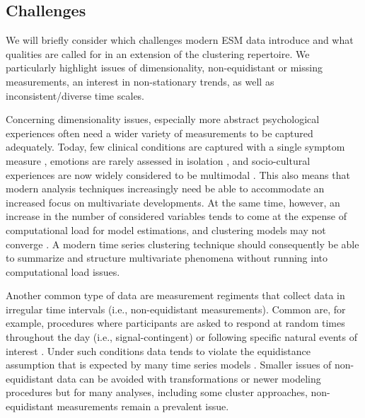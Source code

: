 \documentclass[man, 12pt, a4paper, floatsintext]{apa7}
\theoremstyle{break}
\theoremstyle{plain}
\begin{document}
\subsection{Challenges}

We will briefly consider which challenges modern ESM data introduce and what qualities are called for in an extension of the clustering repertoire. We particularly highlight issues of dimensionality, non-equidistant or missing measurements, an interest in non-stationary trends, as well as inconsistent/diverse time scales. 

Concerning dimensionality issues, especially more abstract psychological experiences often need a wider variety of measurements to be captured adequately. Today, few clinical conditions are captured with a single symptom measure \citep[e.g.,][]{cramer2016}, emotions are rarely assessed in isolation \citep[e.g.,][]{reitsema2022}, and socio-cultural experiences are now widely considered to be multimodal \citep[e.g.,][]{Kreienkamp2022d}. This also means that modern analysis techniques increasingly need be able to accommodate an increased focus on multivariate developments. At the same time, however, an increase in the number of considered variables tends to come at the expense of computational load for model estimations, and clustering models may not converge \citep[the aforementioned dimensionality curse;][]{altman2018}. A modern time series clustering technique should consequently be able to summarize and structure multivariate phenomena without running into computational load issues.

Another common type of data are measurement regiments that collect data in irregular time intervals (i.e., non-equidistant measurements). Common are, for example, procedures where participants are asked to respond at random times throughout the day (i.e., signal-contingent) or following specific natural events of interest \citep[i.e., event-contingent; see][]{shiffman2008, myin-germeys2018}. Under such conditions data tends to violate the equidistance assumption that is expected by many time series models \citep[][]{hamaker2017}. Smaller issues of non-equidistant data can be avoided with transformations \citep[e.g., dynamic time warping,][]{berndt1994} or newer modeling procedures \citep[e.g., continuous-time models;][]{dehaan-rietdijk2017} but for many analyses, including some cluster approaches, non-equidistant measurements remain a prevalent issue. 
\end{document}
